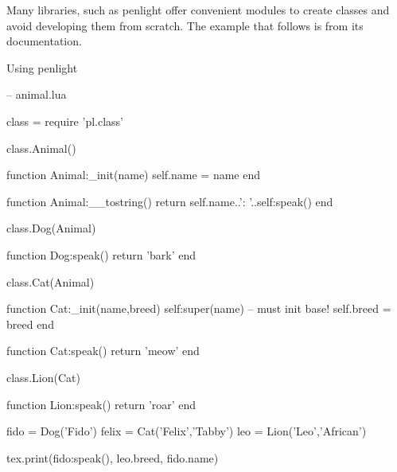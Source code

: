 Many libraries, such as penlight offer convenient modules to create classes and avoid developing them from scratch. The example that follows is from its documentation.

\begin{texexample}{Using penlight}{}
\begin{luacode}

-- animal.lua

class = require 'pl.class'


class.Animal()

function Animal:_init(name)
    self.name = name
end

function Animal:__tostring()
  return self.name..': '..self:speak()
end

class.Dog(Animal)

function Dog:speak()
  return 'bark'
end

class.Cat(Animal)

function Cat:_init(name,breed)
    self:super(name)  -- must init base!
    self.breed = breed
end

function Cat:speak()
  return 'meow'
end

class.Lion(Cat)

function Lion:speak()
  return 'roar'
end

fido = Dog('Fido')
felix = Cat('Felix','Tabby')
leo = Lion('Leo','African')

tex.print(fido:speak(), leo.breed, fido.name)
\end{luacode}
\end{texexample}









